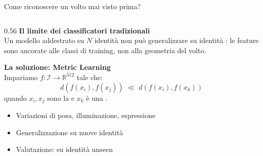 \documentclass[aspectratio=169, 10pt]{beamer}
\begin{document}
\begin{frame}{Come riconoscere un volto mai visto prima?}
\begin{columns}[T, onlytextwidth]

\begin{column}{0.56\textwidth}
    \textbf{Il limite dei classificatori tradizionali}\\[0.35em]
    {\small Un modello addestrato su $N$ identità non può generalizzare
    su identità : le feature sono ancorate alle classi
    di training, non alla geometria del volto.}

    \medskip
    \textbf{La soluzione: Metric Learning}\\[0.25em]
    {\small Impariamo $f:\mathcal{I}\to\mathbb{R}^{512}$ tale che:
    \[
      d\!\left(f(x_i),f(x_j)\right)\;\ll\; d\!\left(f(x_i),f(x_k)\right)
    \]
    quando $x_i,x_j$ sono la 
    e $x_k$ è una .}

    \medskip
    \begin{itemize}
        \item Variazioni di posa, illuminazione, espressione
        \item Generalizzazione  su nuove identità
        \item Valutazione:  su identità unseen
    \end{itemize}
\end{column}


\end{columns}
\end{frame}
\end{document}

